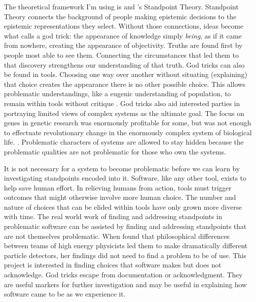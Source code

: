 \documentclass[a4paper,man,natbib,floatsintext]{apa6}
\begin{document}
   The theoretical framework I'm using is \citet{Harding1992-od} and \citet{Haraway1988-nh}'s Standpoint Theory. Standpoint Theory connects the background of people making epistemic decisions to the epistemic representations they select. Without those connections, ideas become what \citet{Haraway1988-nh} calls a god trick: the appearance of knowledge simply \textit{being}, as if it came from nowhere, creating the appearance of objectivity. Truths are found first by people most able to see them. Connecting the circumstances that led them to that discovery strengthens our understanding of that truth. God tricks can also be found in tools. Choosing one way over another without situating (explaining) that choice creates the appearance there is no other possible choice. This allows problematic understandings, like a eugenic understanding of population, to remain within tools without critique \citep{Subramaniam2014-wg}. God tricks also aid interested parties in portraying limited views of complex systems as the ultimate goal. The focus on genes in genetic research was enormously profitable for some, but was not enough to effectuate revolutionary change in the enormously complex system of biological life. \citet{Harraway1997-va,Reardon2017-bo}. Problematic characters of systems are allowed to stay hidden because the problematic qualities are not problematic for those who own the systems. 

   It is not necessary for a system to become problematic before we can learn by investigating standpoints encoded into it. Software, like any other tool, exists to help save human effort. In relieving humans from action, tools must trigger outcomes that might otherwise involve more human choice. The number and nature of choices that can be elided within tools have only grown more diverse with time. The real world work of finding and addressing standpoints in problematic software can be assisted by finding and addressing standpoints that are not themselves problematic. When \citet{Traweek2009-uu} found that philosophical differences between teams of high energy physicists led them to make dramatically different particle detectors, her findings did not need to find a problem to be of use. This project is interested in finding choices that software makes but does not acknowledge. God tricks escape from documentation or acknowledgment. They are useful markers for further investigation and may be useful in explaining how software came to be as we experience it.

  
\end{document}
